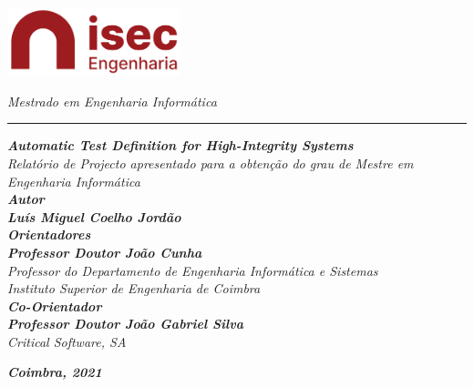\thispagestyle{empty}

\includegraphics[width=5cm]{images/logo-isec-transparente.png}

\begin{flushright}
{\Large{\textsl{Mestrado em Engenharia Informática}}}
\end{flushright}


\rule[0.5ex]{35em}{0.5ex}
\vspace{2ex}

\begin{flushright}
{\LARGE{\textbf{\textsl{Automatic Test Definition for High-Integrity Systems}}}}\\
\vspace{4ex}
{\large{\textsl{Relatório de Projecto apresentado para a obtenção do grau de Mestre em Engenharia Informática}}}\\
\vspace{6ex}
{\normalsize{\textsl{\textbf{Autor}}}}\\
\vspace{1ex}
{\large{\textsl{\textbf{Luís Miguel Coelho Jordão}}}}\\
\vspace{6ex}
{\normalsize{\textsl{\textbf{Orientadores}}}}\\
\vspace{1ex}
{\large{\textsl{\textbf{Professor Doutor João Cunha}}}}\\
\vspace{1ex}
{\large{\textsl{Professor do Departamento de Engenharia Informática e Sistemas}}}\\
\vspace{1ex}
{\large{\textsl{Instituto Superior de Engenharia de Coimbra}}}\\
\vspace{6ex}
{\normalsize{\textsl{\textbf{Co-Orientador}}}}\\
\vspace{1ex}
{\large{\textsl{\textbf{Professor Doutor João Gabriel Silva}}}}\\
\vspace{1ex}
{\large{\textsl{Critical Software, SA}}}\\
\end{flushright}
\vspace{10ex}

\begin{center}
{\large{\textsl{\textbf{Coimbra, 2021}}}}\\
\end{center}

\clearpage
